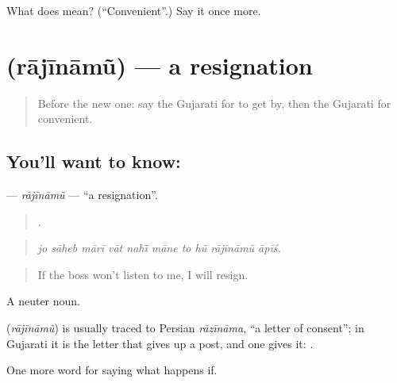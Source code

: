 \begin{tcolorbox}[breakable,colback=teal!4,colframe=teal!35!black,title={Before you move on}]
What does  mean? (\textquotedblleft{}Convenient\textquotedblright{}.) Say it once more.
\end{tcolorbox}
\section[\texorpdfstring{\gu{રાજીનામું} (rājīnāmũ)}{રાજીનામું (rājīnāmũ)}]{ (rājīnāmũ) — a resignation}

\label{lesson:GU-C532-rajinamu}



\begin{quote}
Before the new one: say the Gujarati for to get by, then the Gujarati for convenient.
\end{quote}

\subsection*{You'll want to know: }
\textbf{} — \emph{rājīnāmũ} — \textquotedblleft{}a resignation\textquotedblright{}.

\begin{quote}
         .
\end{quote}

\begin{quote}
\emph{jo sāheb mārī vāt nahī̃ māne to hũ rājīnāmũ āpīś.}
\end{quote}

\begin{quote}
If the boss won't listen to me, I will resign.
\end{quote}

A neuter noun.

\begin{cousinweb}
\textbf{} (\emph{rājīnāmũ}) is usually traced to Persian \emph{rāzīnāma}, \textquotedblleft{}a letter of consent\textquotedblright{}; in Gujarati it is the letter that gives up a post, and one gives it: \textbf{ }.
\end{cousinweb}

\begin{grammarlens}[title={What you've built}]
One more word for saying what happens if.
\end{grammarlens}

